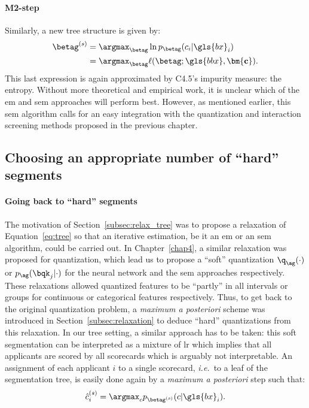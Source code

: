 \paragraph{M2-step} Similarly, a new tree structure is given by:
\begin{align*}
\betag^{(s)} & = \argmax_{\betag} \ln p_{\betag}(c_i | \gls{bx}_i) \\
& = \argmax_{\betag} \ell(\betag; \gls{bbx}, \mathbf{\bm{c}}).
\end{align*}
This last expression is again approximated by C4.5's impurity measure: the entropy. Without more theoretical and empirical work, it is unclear which of the \gls{em} and \gls{sem} approaches will perform best. However, as mentioned earlier, this \gls{sem} algorithm calls for an easy integration with the quantization and interaction screening methods proposed in the previous chapter.

\subsection{Choosing an appropriate number of ``hard'' segments} \label{subsec:hard_seg}

\paragraph{Going back to ``hard'' segments}
The motivation of Section~\ref{subsec:relax_tree} was to propose a relaxation of Equation~\eqref{eq:tree} so that an iterative estimation, be it an \gls{em} or an \gls{sem} algorithm, could be carried out. In Chapter~\ref{chap4}, a similar relaxation was proposed for quantization, which lead us to propose a ``soft'' quantization $\q_{\ag}(\cdot)$ or $p_{\ag}(\bqk_j | \cdot)$ for the neural network and the \gls{sem} approaches respectively. These relaxations allowed quantized features to be ``partly'' in all intervals or groups for continuous or categorical features respectively. Thus, to get back to the original quantization problem, a \textit{maximum a posteriori} scheme was introduced in Section~\ref{subsec:relaxation} to deduce ``hard'' quantizations from this relaxation. In our tree setting, a similar approach has to be taken: this soft segmentation can be interpreted as a mixture of \gls{lr} which implies that all applicants are scored by all scorecards which is arguably not interpretable. An assignment of each applicant $i$ to a single scorecard, \textit{i.e.}\ to a leaf of the segmentation tree, is easily done again by a \textit{maximum a posteriori} step such that:
\begin{equation} \label{eq:max_seg}
\hat{c}_i^{(s)} = \argmax_c p_{\betag^{(s)}}(c | \gls{bx}_i).
\end{equation}

